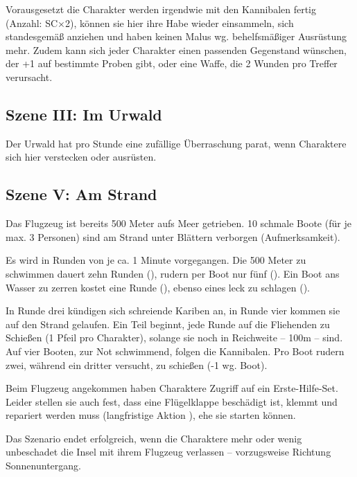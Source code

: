 {		Vorausgesetzt die Charakter werden irgendwie mit den Kannibalen fertig (Anzahl: SC×2), können sie hier ihre Habe wieder einsammeln, sich standesgemäß anziehen und haben keinen Malus wg. behelfsmäßiger Ausrüstung mehr. Zudem kann sich jeder Charakter einen passenden Gegenstand wünschen, der +1 auf bestimmte Proben gibt, oder eine Waffe, die 2 Wunden pro Treffer verursacht.

		\subsection{Szene III: Im Urwald}

		Der Urwald hat pro Stunde eine zufällige Überraschung parat, wenn Charaktere sich hier verstecken oder ausrüsten.


		\subsection{Szene V: Am Strand }

		Das Flugzeug ist bereits 500 Meter aufs Meer getrieben. 10 schmale Boote (für je max. 3 Personen) sind am Strand unter Blättern verborgen (Aufmerksamkeit).

		Es wird in Runden von je ca. 1 Minute vorgegangen. Die 500 Meter zu schwimmen dauert zehn Runden (), rudern per Boot nur fünf (). Ein Boot ans Wasser zu zerren kostet eine Runde (), ebenso eines leck zu schlagen ().

		In Runde drei kündigen sich schreiende Kariben an, in Runde vier kommen sie auf den Strand gelaufen. Ein Teil beginnt, jede Runde auf die Fliehenden zu Schießen (1 Pfeil pro Charakter), solange sie noch in Reichweite -- 100m -- sind. Auf vier Booten, zur Not schwimmend, folgen die Kannibalen. Pro Boot rudern zwei, während ein dritter versucht, zu schießen (-1 wg. Boot).

		Beim Flugzeug angekommen haben Charaktere Zugriff auf ein Erste-Hilfe-Set. Leider stellen sie auch fest, dass eine Flügelklappe beschädigt ist, klemmt und repariert werden muss (langfristige Aktion ), ehe sie starten können.


		\noindent
		Das Szenario endet erfolgreich, wenn die Charaktere mehr oder wenig unbeschadet die Insel mit ihrem Flugzeug verlassen -- vorzugsweise Richtung Sonnenuntergang.
}
